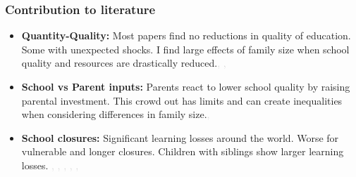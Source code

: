 \documentclass{beamer}
\begin{document}
\begin{frame}
    \label{frame:contribution}

    \hypersetup{citecolor=lightgray}
    
    \frametitle{Contribution to literature}
    \begin{itemize}

    \item \textbf{Quantity-Quality:} Most papers find no reductions in quality of education. Some with unexpected shocks. I find large effects of family size when school quality and resources are drastically reduced.{\tiny\textcolor{lightgray}{\cite{black_more_2005}, \cite{caceres-delpiano_impacts_2006} \cite{conley_parental_2006}, \cite{black_small_2010}  \cite{aslund_family_2010}}}
    \\ 
    \item \textbf{School vs Parent inputs:} Parents react to lower school quality by raising parental investment.  This crowd out has limits and can create inequalities when considering differences in family size.{\tiny\textcolor{lightgray}{\cite{fredriksson_parental_2016}, \cite{houtenville_parental_2008}}}

    \item \textbf{School closures:} Significant learning losses around the world. Worse for vulnerable and longer closures. Children with siblings show larger learning losses. 
    {\tiny\textcolor{lightgray}{ \cite{jakubowski_global_2023}, , \cite{singh_covid-19_2022}, \cite{goldhaber_educational_2023}, \cite{lichand_impacts_2021}, \cite{lichand_lasting_2024}}} 
   
     

\end{itemize}
\end{frame}
\end{document}
